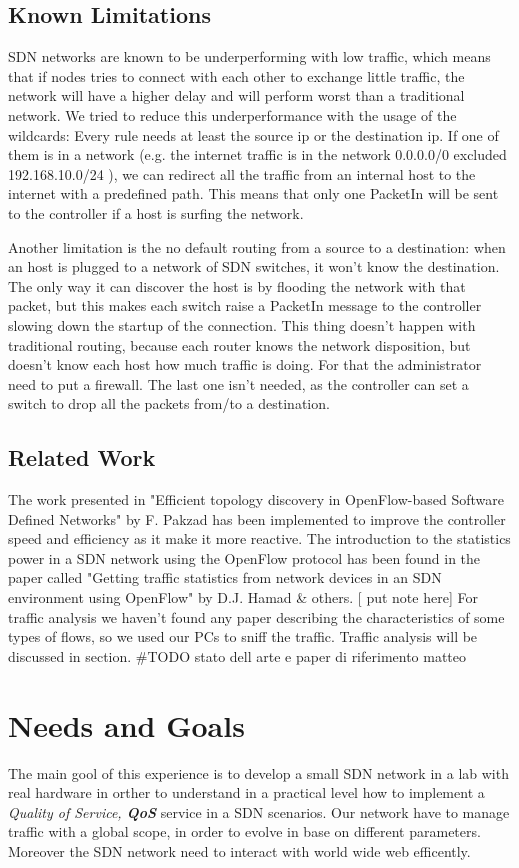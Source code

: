 \documentclass[conference,10pt]{IEEEtran}
\begin{document}
\subsection{Known Limitations}
SDN networks are known to be underperforming with low traffic, which means that if nodes tries to connect with each other
to exchange little traffic, the network will have a higher delay and will perform worst than a
traditional network. We tried to reduce this underperformance with the usage of the wildcards:
Every rule needs at least the source ip or the destination ip. If one of them is in a network
(e.g. the internet traffic is in the network 0.0.0.0/0 excluded 192.168.10.0/24 ),
we can redirect all the traffic from an internal host to the internet with a predefined
path. This means that only one PacketIn will be sent to the controller if a host is surfing the network.

Another limitation is the no default routing from a source to a destination: when an host
is plugged to a network of SDN switches, it won't know the destination. The only way it can
discover the host is by flooding the network with that packet, but this makes each switch raise a PacketIn message to the controller
slowing down the startup of the connection. This thing doesn't happen with traditional routing, because each router knows
the network disposition, but doesn't know each host how much traffic is doing. For that the administrator need to put a firewall.
The last one isn't needed, as the controller can set a switch to drop all the packets from/to a destination.


\subsection{Related Work}
  The work presented in
"Efficient topology discovery in OpenFlow-based Software Defined Networks" by F. Pakzad \cite{farzaneh}
has been implemented to improve the controller speed and efficiency as it make it more reactive.
The introduction to the statistics power in a SDN network using the OpenFlow protocol has been found
in the paper called "Getting traffic statistics from network devices in an SDN environment using OpenFlow" by D.J. Hamad \& others. [ put note here]
For traffic analysis we haven't found any paper describing the characteristics of
some types of flows, so we used our PCs to sniff the traffic. Traffic analysis will be discussed in section.
  \#TODO stato dell arte e paper di riferimento  matteo

\section{Needs and Goals}\label{sec:obb} %
The main gool of this experience is to develop a small SDN network in a lab with real hardware
in orther to understand in a practical level how to implement a \textit{Quality of Service, \textbf{QoS}} service in a SDN scenarios.
Our network have to manage traffic with a global scope, in order to evolve in base on different parameters.
Moreover the SDN network need to interact with world wide web efficently.
\end{document}
